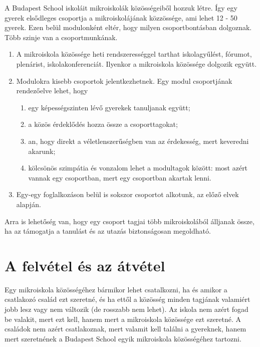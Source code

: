 A Budapest School iskoláit mikroiskolák közösségeiből hozzuk létre. Így
egy gyerek elsődleges csoportja a mikroiskolájának közzössége, ami lehet
12 - 50 gyerek. Ezen belül modulonként eltér, hogy milyen
csoportbontásban dolgoznak. Több szinje van a csoportmunkának.
\begin{enumerate}

      \item A mikroiskola közössége heti rendszerességgel tarthat
            iskolagyűlést,
            fórumot, plenárist, iskolakonferenciát. Ilyenkor a mikroiskola
            közössége
            dolgozik együtt.
      \item  Modulokra kisebb csoportok jelentkezhetnek. Egy modul
            csoportjának rendezőelve lehet, hogy
            \begin{enumerate}
                  \item egy képességszinten lévő gyerekek tanuljanak együtt;
                  \item a közös érdeklődés hozza össze a
                        csoporttagokat;
                  \item an, hogy direkt a véletlenszerűségben van az
                        érdekesség, mert keveredni akarunk;
                  \item kölcsönös szimpátia és vonzalom
                        lehet a modultagok között: most azért vannak egy
                        csoportban,
                        mert egy
                        csoportban akartak lenni.
            \end{enumerate}
      \item  Egy-egy foglalkozáson belül is sokszor
            csoportot alkotunk, az előző elvek alapján.

\end{enumerate}

Arra is lehetőség van, hogy egy csoport tagjai több mikroiskolából álljanak
össze, ha az támogatja a tanulást és az utazás biztonságosan megoldható.
% 



\section{A felvétel és az
  átvétel}

Egy mikroiskola közösségéhez bármikor lehet csatalkozni, ha és amikor a
csatlakozó
család ezt szeretné, és ha ettől a közösség minden tagjának valamiért  jobb
lesz vagy nem változik (de rosszabb nem lehet).
Az iskola nem azért fogad be valakit, mert
ezt kell, hanem mert a mikroiskola közössége ezt szeretné.
A családok nem azért csatlakoznak, mert valamit kell találni a gyereknek, hanem
mert
szeretnének a Budapest School egyik mikroiskola közösségéhez tartozni.

